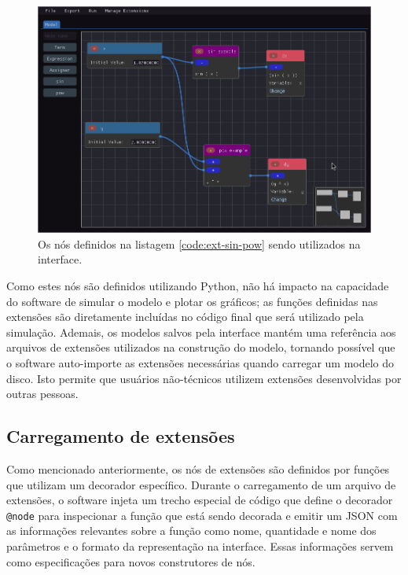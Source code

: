 \documentclass[
	12pt,				%
	openright,			%
	oneside,			%
	a4paper,			%
	main=brazil,
	english,			%
	]{ufsj-abntex2}
\begin{document}
\begin{figure}[h]
    \centering
    \includegraphics[scale=0.45]{imgs/ode-designer/ext-sin-pow.png} 
    \caption{Os nós definidos na listagem \ref{code:ext-sin-pow} sendo utilizados na interface.}
    \label{fig:ext-sin-pow}
\end{figure}

Como estes nós são definidos utilizando Python, não há impacto na capacidade do software de simular o modelo e plotar os gráficos; as funções definidas nas extensões são diretamente incluídas no código final que será utilizado pela simulação. Ademais, os modelos salvos pela interface mantém uma referência aos arquivos de extensões utilizados na construção do modelo, tornando possível que o software auto-importe as extensões necessárias quando carregar um modelo do disco. Isto permite que usuários não-técnicos utilizem extensões desenvolvidas por outras pessoas.

\subsection{Carregamento de extensões}

Como mencionado anteriormente, os nós de extensões são definidos por funções que utilizam um decorador específico. Durante o carregamento de um arquivo de extensões, o software injeta um trecho especial de código que define o decorador \texttt{@node} para inspecionar a função que está sendo decorada e emitir um JSON com as informações relevantes sobre a função como nome, quantidade e nome dos parâmetros e o formato da representação na interface. Essas informações servem como especificações para novos construtores de nós.
\end{document}
